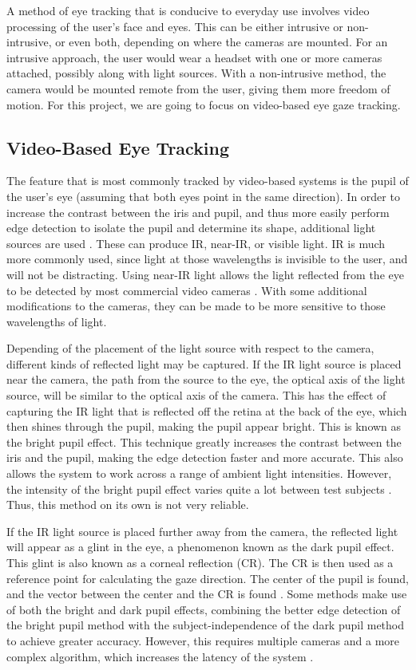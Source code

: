 \documentclass[12pt,conference,onecolumn]{IEEEtran}
\begin{document}
A method of eye tracking that is conducive to everyday use involves video processing of the user's face and eyes. This can be either intrusive or non-intrusive, or even both, depending on where the cameras are mounted. For an intrusive approach, the user would wear a headset with one or more cameras attached, possibly along with light sources. With a non-intrusive method, the camera would be mounted remote from the user, giving them more freedom of motion. For this project, we are going to focus on video-based eye gaze tracking.

\subsection{Video-Based Eye Tracking}
The feature that is most commonly tracked by video-based systems is the pupil of the user's eye (assuming that both eyes point in the same direction). In order to increase the contrast between the iris and pupil, and thus more easily perform edge detection to isolate the pupil and determine its shape, additional light sources are used . These can produce IR, near-IR, or visible light. IR is much more commonly used, since light at those wavelengths is invisible to the user, and will not be distracting. Using near-IR light allows the light reflected from the eye to be detected by most commercial video cameras \cite{morimoto}. With some additional modifications to the cameras, they can be made to be more sensitive to those wavelengths of light. 

Depending of the placement of the light source with respect to the camera, different kinds of reflected light may be captured. If the IR light source is placed near the camera, the path from the source to the eye, the optical axis of the light source, will be similar to the optical axis of the camera. This has the effect of capturing the IR light that is reflected off the retina at the back of the eye, which then shines through the pupil, making the pupil appear bright. This is known as the bright pupil effect. This technique greatly increases the contrast between the iris and the pupil, making the edge detection faster and more accurate. This also allows the system to work across a range of ambient light intensities. However, the intensity of the bright pupil effect varies quite a lot between test subjects \cite{morimoto}. Thus, this method on its own is not very reliable.

If the IR light source is placed further away from the camera, the reflected light will appear as a glint in the eye, a phenomenon known as the dark pupil effect. This glint is also known as a corneal reflection (CR). The CR is then used as a reference point for calculating the gaze direction. The center of the pupil is found, and the vector between the center and the CR is found \cite{morimoto}. Some methods make use of both the bright and dark pupil effects, combining the better edge detection of the bright pupil method with the subject-independence of the dark pupil method to achieve greater accuracy. However, this requires multiple cameras and a more complex algorithm, which increases the latency of the system \cite{chennamma2013survey}. 
\end{document}
